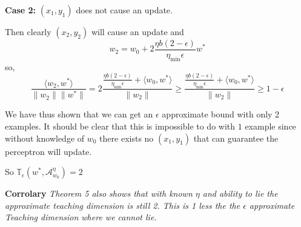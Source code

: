 \documentclass{article}
\newcommand{\learn}{\mathcal{A}_{w_0}^\eta}
\begin{document}
\textbf{Case 2:} $(x_1, y_1)$ does not cause an update.

Then clearly $(x_2, y_2)$ will cause an update and
$$
w_2 = w_0 + 2\frac{\eta b(2-\epsilon)}{\eta_{\min} \epsilon}w^* 
$$
so,
$$
\frac{\langle w_2 , w^* \rangle}{\lVert w_2 \rVert \lVert w^* \rVert} = 2\frac{\frac{\eta b(2-\epsilon)}{\eta_{\min} \epsilon} + \langle w_0, w^* \rangle}{\lVert w_2 \rVert} \geq \frac{\frac{\eta b(2-\epsilon)}{\eta_{\min} \epsilon} + \langle w_0, w^* \rangle}{\lVert w_2 \rVert} \geq 1 - \epsilon
$$

We have thus shown that we can get an $\epsilon$ approximate bound with only 2 examples. It should be clear that this is impossible to do with $1$ example since without knowledge of $w_0$ there exists no $(x_1, y_1)$ that can guarantee the perceptron will update.

So 
$
\mathbb{T}_{\epsilon}(w^*, \learn) = 2
$

\textbf{Corrolary}
\textit{
Theorem 5 also shows that with known $\eta$ and ability to lie the approximate teaching dimension is still 2. This is 1 less the the $\epsilon$ approximate Teaching dimension where we cannot lie. \cite{perceptron}
}


\small


\end{document}
